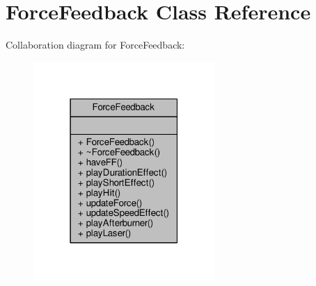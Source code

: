 \hypertarget{classForceFeedback}{}\section{Force\+Feedback Class Reference}
\label{classForceFeedback}


Collaboration diagram for Force\+Feedback\+:
\nopagebreak
\begin{figure}[H]
\begin{center}
\leavevmode
\includegraphics[width=195pt]{db/ded/classForceFeedback__coll__graph}
\end{center}
\end{figure}
